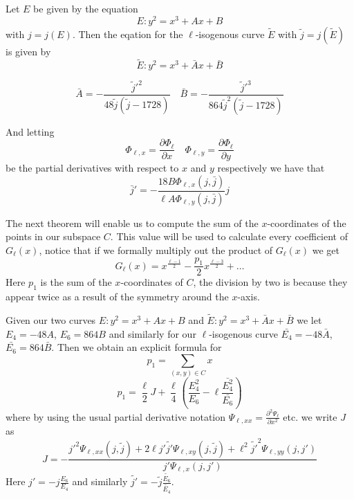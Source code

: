 \begin{thm}
 Let $E$ be given by the equation
$$ E: y^2 = x^3 + Ax + B $$
with $j = j(E)$. Then the eqation for the $\ell$-isogenous curve $\tilde{E}$ with
$\tilde{j} = j(\tilde{E})$ is given by
$$ \tilde{E}: y^2 = x^3 + \bar{A}x + \bar{B} $$

$$\bar{A} = -\frac{\tilde{j}'^2}{48 \tilde{j}(\tilde{j} - 1728)} \quad
  \bar{B} = -\frac{\tilde{j}'^3}{864 \tilde{j}^2(\tilde{j} - 1728)} $$

And letting $$\Phi_{\ell, x} = \frac{\partial \Phi_\ell}{\partial x} \quad
              \Phi_{\ell, y} = \frac{\partial \Phi_\ell}{\partial y}$$
be the partial derivatives with respect to $x$ and $y$ respectively we have that
$$ \bar{j}' = -\frac{18 B \Phi_{\ell, x}(j, \bar{j})}{\ell A \Phi_{\ell, y}(j, \bar{j})} j $$
\end{thm}
The next theorem will enable us to compute the sum of the $x$-coordinates of the points in
our subspace $C$. This value will be used to calculate every coefficient of $G_\ell(x)$, notice
that if we formally multiply out the product of $G_\ell(x)$ we get
$$ G_\ell(x) = x^\frac{\ell-1}{2} - \frac{p_1}{2} x^\frac{\ell-3}{2} + \ldots $$
Here $p_1$ is the sum of the $x$-coordinates of $C$, the division by two is because they
appear twice as a result of the symmetry around the $x$-axis.
\begin{thm}
 Given our two curves $E: y^2 = x^3 + Ax + B$ and $\tilde{E}: y^2 = x^3 + \bar{A}x + \bar{B}$ we let
$E_4 = -48A$, $E_6 = 864B$ and similarly for our $\ell$-isogenous curve $\bar{E_4} = -48\bar{A}$,
$\bar{E_6} = 864\bar{B}$. Then we obtain an explicit formula for
$$ p_1 = \sum_{(x,y)\in C} x $$
$$ p_1 = \frac{\ell}{2}J + \frac{\ell}{4} \left( \frac{E_4^2}{E_6} - \ell \frac{\bar{E_4^2}}{\bar{E_6}} \right) $$
where by using the usual partial derivative notation $\Psi_{\ell, xx} = \frac{\partial^2 \Psi_\ell}{\partial x^2}$
etc. we write $J$ as 
$$ J = -\frac{j'^2 \Psi_{\ell, xx}(j, \tilde{j}) + 2\ell j' \tilde{j'} \Psi_{\ell, xy}(j, \tilde{j})
+\ell^2 \tilde{j'}^2 \Psi_{\ell, yy}(j, j')}{j' \Psi_{\ell, x}(j, j')} $$
Here $j'= -j \frac{E_6}{E_4}$ and similarly $\tilde{j'} = -\tilde{j} \frac{\tilde{E_6}}{\tilde{E_4}}$.
\end{thm}

